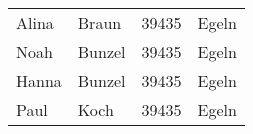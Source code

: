 \begin{center}
    \begin{small}
        \tablehead{}
        \begin{msoraclesql}
            \begin{supertabular}{llll}
                Alina & Braun & 39435 & Egeln \\
                Noah & Bunzel & 39435 & Egeln \\
                Hanna & Bunzel & 39435 & Egeln \\
                Paul & Koch & 39435 & Egeln \\
            \end{supertabular}
        \end{msoraclesql}
    \end{small}
\end{center}
